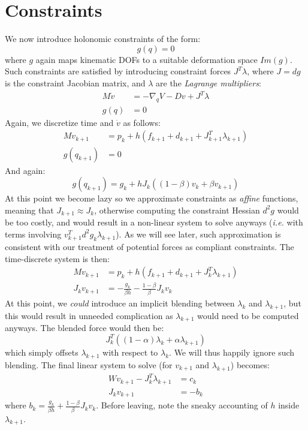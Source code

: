 \documentclass{article}
\newcommand{\dd}{d}
\newcommand{\block}[1]{\left(#1\right)}
\begin{document}
\section{Constraints}
\label{sec:constraints}
%
We now introduce holonomic constraints of the form:
%
\begin{equation}
  g(q) = 0
\end{equation}
%
where $g$ again maps kinematic DOFs to a suitable deformation space
$Im(g)$. Such constraints are satisfied by introducing constraint
forces $J^T\lambda$, where $J = \dd g$ is the constraint Jacobian
matrix, and $\lambda$ are the \emph{Lagrange multipliers}:
%
\begin{align}
  \label{eq:constrained-dynamics}
  M \dot{v} &= -\nabla_q V - D v + J^T \lambda\\
  g(q) &= 0
\end{align}
%
Again, we discretize time and $\dot{v}$ as follows:
%
\begin{align}
  M v_{k+1} &= p_k + h \block{f_{k+1} + d_{k+1} + J_{k+1}^T\lambda_{k+1}} \\
  g\block{q_{k+1}} &= 0 
\end{align}
%
And again:
\begin{equation}
g( q_{k+1}) = g_k + h J_k \block{ (1 - \beta) v_k + \beta v_{k+1}}  
\end{equation}
%
At this point we become lazy so we approximate constraints as
\emph{affine} functions, meaning that $J_{k+1} \approx J_k$, otherwise
computing the constraint Hessian $\dd^2 g$ would be too costly, and
would result in a non-linear system to solve anyways (\emph{i.e.}
with terms involving $v_{k+1}^T\dd^2g_k \lambda_{k+1}$). As we will
see later, such approximation is consistent with our treatment of
potential forces as compliant constraints. The time-discrete system is
then:
%
\begin{align}
  M v_{k+1} &= p_k + h \block{f_{k+1} + d_{k+1} + J_k^T\lambda_{k+1}} \\
  J_k v_{k+1} &= -\frac{g_k}{\beta h} - \frac{1 - \beta}{\beta} J_k v_k \label{eq:constraintvalue}
\end{align}
% 
At this point, we \emph{could} introduce an implicit blending between
$\lambda_k$ and $\lambda_{k+1}$, but this would result in unneeded
complication as $\lambda_{k+1}$ would need to be computed anyways. The
blended force would then be:
\[ J_k^T\block{ (1-\alpha) \lambda_k + \alpha \lambda_{k+1} } \] which
simply offsets $\lambda_{k+1}$ with respect to $\lambda_k$. We will
thus happily ignore such blending. The final linear system to solve
(for $v_{k+1}$ and $\lambda_{k+1}$) becomes:
%
\begin{align}
\label{eq:constrained-integrator}
  W v_{k+1} - J_k^T \lambda_{k+1} &= c_k  \\
  J_k v_{k+1} &= -b_k
\end{align}
where $b_k = \frac{g_k}{\beta h} + \frac{1 - \beta}{\beta} J_k
v_k$. Before leaving, note the sneaky accounting of $h$ inside
$\lambda_{k+1}$.
%
\end{document}
